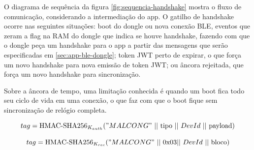 \documentclass[
	12pt,
	article,			%
	oneside,
	a4paper,
	english,
	brazil				%
	]{abntex2}
\begin{document}
O diagrama de sequência da figura \ref{fig:sequencia-handshake} mostra o fluxo de comunicação, considerando a intermediação do app. O gatilho de handshake ocorre nas seguintes
situações: boot do dongle ou nova conexão BLE, eventos que zeram a flag na RAM do dongle que indica se houve handshake, fazendo com que o dongle peça um handshake para o app
a partir das mensagens que serão especificadas em \ref{sec:app-ble-dongle}; token JWT perto de expirar, o que força um novo handshake para nova emissão de token JWT; ou âncora rejeitada,
que força um novo handshake para sincronização.

Sobre a âncora de tempo, uma limitação conhecida é quando um boot fica todo seu ciclo de vida em uma conexão, o que faz com que o boot fique sem sincronização de relógio completa.


\begin{equation} \label{eq:hmac-sha256-auth}
	tag = \text{HMAC-SHA256}_{K_{auth}}("MALCONG"\ ||\ \text{tipo}\ ||\ DevId\ ||\ \text{payload})
\end{equation}

\begin{equation} \label{eq:hmac-sha256-rec}
	tag = \text{HMAC-SHA256}_{K_{rec}}("MALCONG"\ ||\ \text{0x03} ||\ DevId\ ||\ \text{bloco})
\end{equation}
\end{document}
